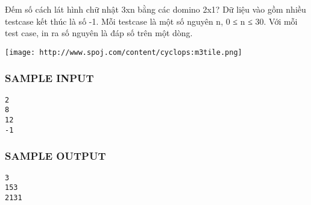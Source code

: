 

Đếm số cách lát hình chữ nhật 3xn bằng các domino 2x1? Dữ liệu vào gồm nhiều testcase kết thúc là số -1. Mỗi testcase là một số nguyên n, 0 ≤ n ≤ 30. Với mỗi test case, in ra số nguyên là đáp số trên một dòng.


\texttt{[image: http://www.spoj.com/content/cyclops:m3tile.png]}

\subsubsection{SAMPLE INPUT}
\begin{verbatim}
2
8
12
-1
\end{verbatim}

\subsubsection{SAMPLE OUTPUT}
\begin{verbatim}
3
153
2131
\end{verbatim}
